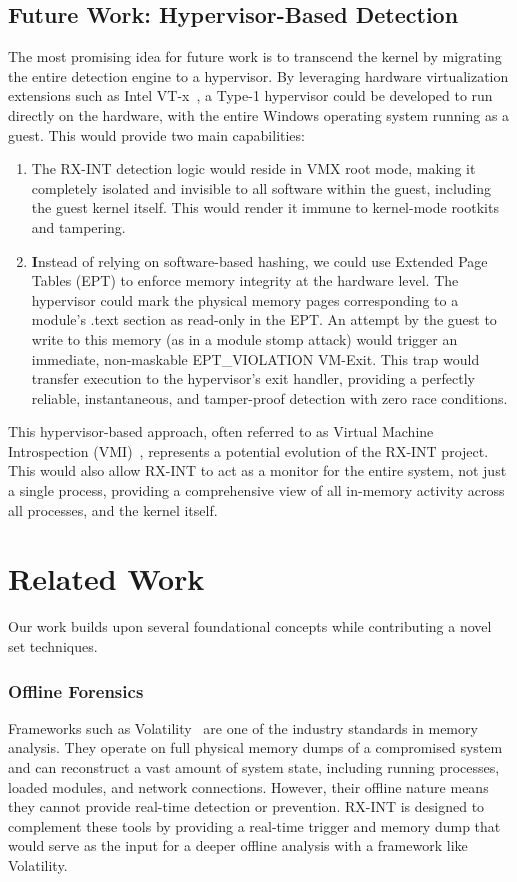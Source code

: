 \documentclass[journal]{IEEEtran}
\begin{document}
\subsection{Future Work: Hypervisor-Based Detection}
The most promising idea for future work is to transcend the kernel by migrating the entire detection engine to a hypervisor. By leveraging hardware virtualization extensions such as Intel VT-x~\cite{IntelVTX}, a Type-1 hypervisor could be developed to run directly on the hardware, with the entire Windows operating system running as a guest.
This would provide two main capabilities:
\begin{enumerate}
\item The RX-INT detection logic would reside in VMX root mode, making it completely isolated and invisible to all software within the guest, including the guest kernel itself. This would render it immune to kernel-mode rootkits and tampering.
\item \textbf Instead of relying on software-based hashing, we could use Extended Page Tables (EPT) to enforce memory integrity at the hardware level. The hypervisor could mark the physical memory pages corresponding to a module's .text section as read-only in the EPT. An attempt by the guest to write to this memory (as in a module stomp attack) would trigger an immediate, non-maskable EPT\_VIOLATION VM-Exit. This trap would transfer execution to the hypervisor's exit handler, providing a perfectly reliable, instantaneous, and tamper-proof detection with zero race conditions.
\end{enumerate}
This hypervisor-based approach, often referred to as Virtual Machine Introspection (VMI)~\cite{Garfinkel2003_VMI}, represents a potential evolution of the RX-INT project. This would also allow RX-INT to act as a monitor for the entire system, not just a single process, providing a comprehensive view of all in-memory activity across all processes, and the kernel itself.

\section{Related Work}\label{sec:related_work}
Our work builds upon several foundational concepts while contributing a novel set techniques.
\subsubsection{Offline Forensics}
Frameworks such as Volatility~\cite{Ligh2005_Volatility} are one of the industry standards in memory analysis. They operate on full physical memory dumps of a compromised system and can reconstruct a vast amount of system state, including running processes, loaded modules, and network connections. However, their offline nature means they cannot provide real-time detection or prevention. RX-INT is designed to complement these tools by providing a real-time trigger and memory dump that would serve as the input for a deeper offline analysis with a framework like Volatility.
\end{document}
